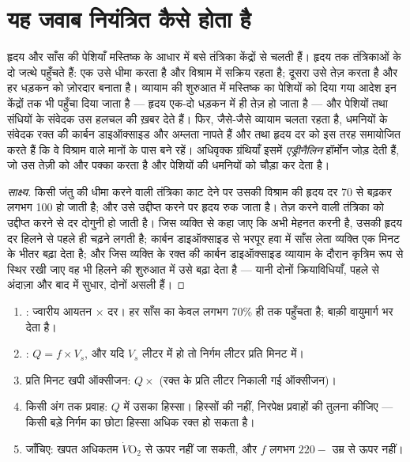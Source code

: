 \section{यह जवाब नियंत्रित कैसे होता है}

\begin{proposition}[तंत्रिका और हॉर्मोन का नियंत्रण]\label{prop:g10:heart-lungs-effort:control}
हृदय और साँस की पेशियाँ मस्तिष्क के आधार में बसे तंत्रिका केंद्रों से
चलती हैं। हृदय तक तंत्रिकाओं के दो जत्थे पहुँचते हैं: एक उसे धीमा करता
है और विश्राम में सक्रिय रहता है; दूसरा उसे तेज़ करता है और हर धड़कन को
ज़ोरदार बनाता है। व्यायाम की शुरुआत में मस्तिष्क का पेशियों को दिया गया
आदेश इन केंद्रों तक भी पहुँचा दिया जाता है --- हृदय एक-दो धड़कन में ही
तेज़ हो जाता है --- और पेशियों तथा संधियों के संवेदक उस हलचल की ख़बर देते
हैं। फिर, जैसे-जैसे व्यायाम चलता रहता है, धमनियों के संवेदक रक्त की
कार्बन डाइऑक्साइड और अम्लता नापते हैं और  तथा हृदय दर को इस तरह
समायोजित करते हैं कि वे विश्राम वाले मानों के पास बने रहें। अधिवृक्क
ग्रंथियाँ इसमें \emph{एड्रीनैलिन} हॉर्मोन जोड़ देती
हैं, जो उस तेज़ी को और पक्का करता है और पेशियों की धमनियों को चौड़ा कर
देता है।
\end{proposition}
\begin{proof}[साक्ष्य]
किसी जंतु की धीमा करने वाली तंत्रिका काट देने पर उसकी विश्राम की हृदय दर
70 से बढ़कर लगभग 100 हो जाती है; और उसे उद्दीप्त करने पर हृदय रुक जाता
है। तेज़ करने वाली तंत्रिका को उद्दीप्त करने से दर दोगुनी हो जाती है।
जिस व्यक्ति से कहा जाए कि अभी मेहनत करनी है, उसकी हृदय दर हिलने से पहले
ही चढ़ने लगती है; कार्बन डाइऑक्साइड से भरपूर हवा में साँस लेता व्यक्ति एक
मिनट के भीतर  बढ़ा देता है; और जिस व्यक्ति के रक्त की कार्बन
डाइऑक्साइड व्यायाम के दौरान कृत्रिम रूप से स्थिर रखी जाए वह भी हिलने की
शुरुआत में उसे बढ़ा देता है --- यानी दोनों क्रियाविधियाँ, पहले से अंदाज़ा
और बाद में सुधार, दोनों असली हैं।
\end{proof}

\begin{method}[ऑक्सीजन के पहुँचने की गणना]\label{met:g10:heart-lungs-effort:compute}
\begin{enumerate}
  \item {}: ज्वारीय आयतन $\times$ दर। हर साँस का केवल लगभग 70\% ही
         तक पहुँचता है; बाक़ी वायुमार्ग भर देता है।
  \item {}: $Q = f \times V_s$, और यदि $V_s$ लीटर में हो तो
        निर्गम लीटर प्रति मिनट में।
  \item प्रति मिनट खपी ऑक्सीजन: $Q \times$ (रक्त के प्रति लीटर निकाली
        गई ऑक्सीजन)।
  \item किसी अंग तक प्रवाह: $Q$ में उसका हिस्सा। हिस्सों की नहीं,
        निरपेक्ष प्रवाहों की तुलना कीजिए --- किसी बड़े निर्गम का छोटा
        हिस्सा अधिक रक्त हो सकता है।
  \item जाँचिए: खपत अधिकतम $\dot V\!\mathrm{O_2}$ से ऊपर नहीं जा सकती,
        और $f$ लगभग $220 - $ उम्र से ऊपर नहीं।
\end{enumerate}
\end{method}

